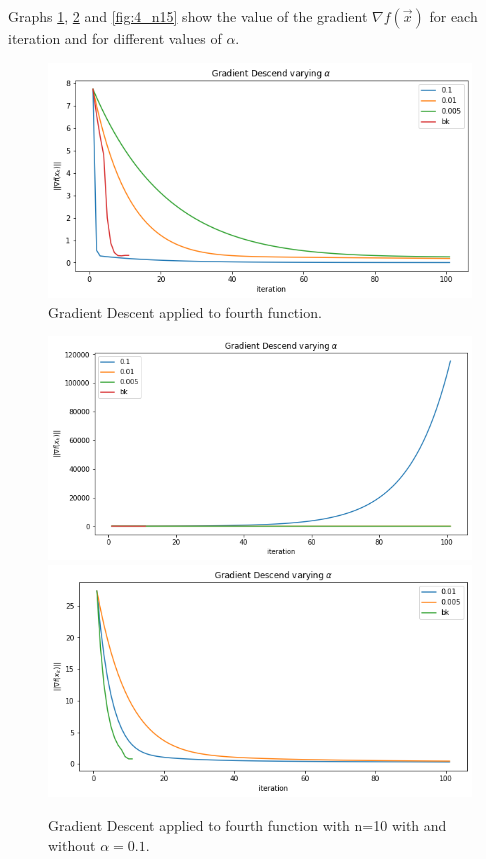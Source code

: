 \documentclass[a4paper,10pt]{report}
\begin{document}
Graphs \ref{fig:4}, \ref{fig:4_n10} and \ref{fig:4_n15} show the value of the gradient $\nabla f(\vec{x})$ for each iteration and for different values of $\alpha$.

\begin{figure}[!htb]
  \center
  \includegraphics[width=0.8\linewidth]{4_a.png}
  \caption{Gradient Descent applied to fourth function.}
  \label{fig:4}
\end{figure}

\begin{figure}[!htb]
    \includegraphics[width=\linewidth]{4_a_n10_1.png}
  \endminipage\hfill
    \includegraphics[width=\linewidth]{4_a_n10_2.png}
  \endminipage\hfill
  \caption{Gradient Descent applied to fourth function with n=10 with and without $\alpha=0.1$.}
  \label{fig:4_n10}
\end{figure}
\end{document}
